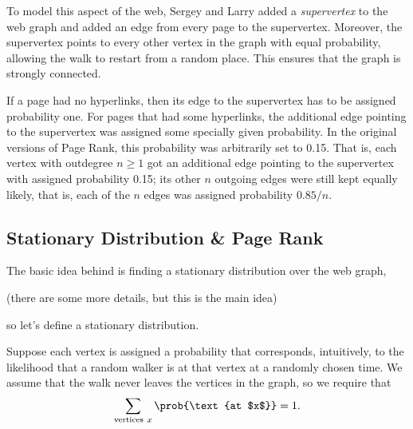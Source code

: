 To model this aspect of the web, Sergey and Larry added a
\emph{supervertex} to the web graph and added an edge from every page
to the supervertex.  Moreover, the supervertex points to every other
vertex in the graph with equal probability, allowing the walk to
restart from a random place.  This ensures that the graph is strongly
connected.

If a page had no hyperlinks, then its edge to the supervertex has to
be assigned probability one.  For pages that had some hyperlinks, the
additional edge pointing to the supervertex was assigned some
specially given probability.  In the original versions of Page Rank,
this probability was arbitrarily set to 0.15.  That is, each vertex
with outdegree $n \ge 1$ got an additional edge pointing to the
supervertex with assigned probability 0.15; its other $n$ outgoing
edges were still kept equally likely, that is, each of the $n$ edges
was assigned probability $0.85/n$.

\begin{editingnotes}
\end{editingnotes}

\iffalse
For example, below left is a graph and below right is the same
graph after adding the supervertex $x_{N+1}$.

\bigskip\centerline{
  \resizebox{!}{1.3in}{\texttt{[image: randomWalkFigs/adjMatrix2]}}
  \hspace{2cm}
  \resizebox{!}{1.5in}{\texttt{[image: randomWalkFigs/sinkGraph]}}
}\bigskip

The addition of the supervertex also removes the possibility that the value
$1/\outdegr{x}$ might involve a division by zero.
\fi

\subsection{Stationary Distribution \& Page Rank}\label{stationary_sec}

The basic idea behind  is finding a stationary
distribution over the web graph,
\begin{editingnotes}
(there are some more details, but this is the main idea)
\end{editingnotes}
so let's define a stationary distribution.

Suppose each vertex is assigned a probability that corresponds, intuitively,
to the likelihood that a random walker is at that vertex at a randomly
chosen time.  We assume that the walk never leaves the vertices in the graph,
so we require that
\begin{equation}\label{LN12:sum1}
\sum_{\text{vertices}\ x} \prob{\text{at $x$}} = 1.
\end{equation}

